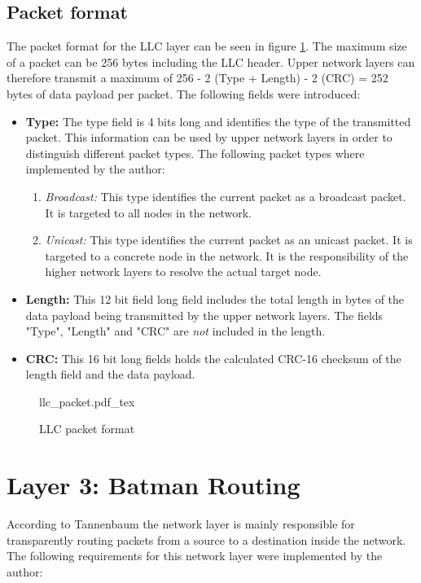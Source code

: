 \subsection{Packet format}%
The packet format for the LLC layer can be seen in figure \ref{fig:llc_format}. The maximum size of a packet can be 256 bytes including the LLC header. Upper network layers can therefore transmit a maximum of 256 - 2 (Type + Length) - 2 (CRC) = 252 bytes of data payload per packet. The following fields were introduced:
\begin{itemize}
    \item \textbf{Type:} The type field is 4 bits long and identifies the type of the transmitted packet. This information can be used by upper network layers in order to distinguish different packet types. The following packet types where implemented by the author:
\begin{enumerate}
    \item \emph{Broadcast:} This type identifies the current packet as a broadcast packet. It is targeted to all nodes in the network.
    \item \emph{Unicast:} This type identifies the current packet as an unicast packet. It is targeted to a concrete node in the network. It is the responsibility of the higher network layers to resolve the actual target node.
\end{enumerate}
    \item \textbf{Length:} This 12 bit field long field includes the total length in bytes of the data payload being transmitted by the upper network layers. The fields "Type", "Length" and "CRC" are \emph{not} included in the length.
    \item \textbf{CRC:} This 16 bit long fields holds the calculated CRC-16 checksum of the length field and the data payload.
\end{itemize}

\begin{figure}[H]
    \centering
    {llc_packet.pdf_tex}
    \caption{LLC packet format}
    \label{fig:llc_format}
\end{figure}

\section{Layer 3: Batman Routing}%
According to Tannenbaum the network layer is mainly responsible for transparently routing packets from a source to a destination inside the network. The following requirements for this network layer were implemented by the author:

